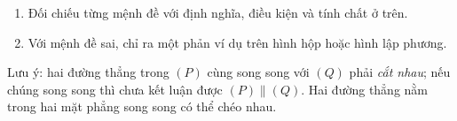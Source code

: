 \begin{enumerate}
\item Đối chiếu từng mệnh đề với định nghĩa, điều kiện và tính chất ở trên.
\item Với mệnh đề sai, chỉ ra một phản ví dụ trên hình hộp hoặc hình lập phương.
\end{enumerate}
Lưu ý: hai đường thẳng trong $(P)$ cùng song song với $(Q)$ phải \emph{cắt nhau}; nếu chúng song song thì chưa kết luận được $(P)\parallel(Q)$. Hai đường thẳng nằm trong hai mặt phẳng song song có thể chéo nhau.
